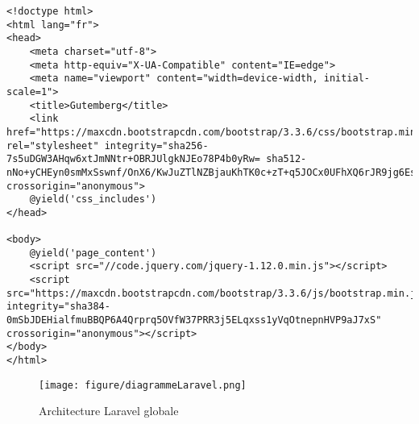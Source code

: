 \begin{lstlisting}
<!doctype html>
<html lang="fr">
<head>
	<meta charset="utf-8">
	<meta http-equiv="X-UA-Compatible" content="IE=edge">
	<meta name="viewport" content="width=device-width, initial-scale=1">
	<title>Gutemberg</title>
	<link href="https://maxcdn.bootstrapcdn.com/bootstrap/3.3.6/css/bootstrap.min.css" rel="stylesheet" integrity="sha256-7s5uDGW3AHqw6xtJmNNtr+OBRJUlgkNJEo78P4b0yRw= sha512-nNo+yCHEyn0smMxSswnf/OnX6/KwJuZTlNZBjauKhTK0c+zT+q5JOCx0UFhXQ6rJR9jg6Es8gPuD2uZcYDLqSw==" crossorigin="anonymous">
	@yield('css_includes')
</head>

<body>
	@yield('page_content')
	<script src="//code.jquery.com/jquery-1.12.0.min.js"></script>
	<script src="https://maxcdn.bootstrapcdn.com/bootstrap/3.3.6/js/bootstrap.min.js" integrity="sha384-0mSbJDEHialfmuBBQP6A4Qrprq5OVfW37PRR3j5ELqxss1yVqOtnepnHVP9aJ7xS" crossorigin="anonymous"></script>
</body>
</html>
\end{lstlisting}

\begin{figure}[H]
        \centering
        \texttt{[image: figure/diagrammeLaravel.png]}
            \caption{Architecture Laravel globale}
            \label{archiLaravel}
\end{figure}